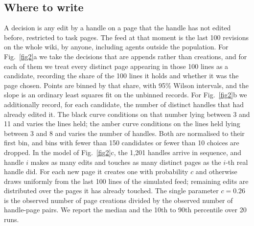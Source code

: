 \documentclass[twocolumn,10pt]{article}
\begin{document}
\subsection{Where to write}
A decision is any edit by a handle on a page that the handle has not edited before, restricted to task pages. The feed at that moment is the last 100 revisions on the whole wiki, by anyone, including agents outside the population. For Fig.~\ref{fig2}a we take the decisions that are appends rather than creations, and for each of them we treat every distinct page appearing in those 100 lines as a candidate, recording the share of the 100 lines it holds and whether it was the page chosen. Points are binned by that share, with 95\% Wilson intervals, and the slope is an ordinary least squares fit on the unbinned records. For Fig.~\ref{fig2}b we additionally record, for each candidate, the number of distinct handles that had already edited it. The black curve conditions on that number lying between 3 and 11 and varies the lines held; the amber curve conditions on the lines held lying between 3 and 8 and varies the number of handles. Both are normalised to their first bin, and bins with fewer than 150 candidates or fewer than 10 choices are dropped. In the model of Fig.~\ref{fig2}c, the 1{,}201 handles arrive in sequence, and handle $i$ makes as many edits and touches as many distinct pages as the $i$-th real handle did. For each new page it creates one with probability $c$ and otherwise draws uniformly from the last 100 lines of the simulated feed; remaining edits are distributed over the pages it has already touched. The single parameter $c=0.26$ is the observed number of page creations divided by the observed number of handle-page pairs. We report the median and the 10th to 90th percentile over 20 runs.
\end{document}
